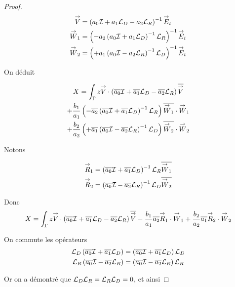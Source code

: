 \begin{proof}
    \newcommand{\vV}{\vect{V}}
    \newcommand{\vW}{\vect{W}}

    \begin{align*}
      \vV & = \left(a_0\oI  + a_1 \LD - a_2\LR \right)^{-1} \vE_t
      \\
      \vW_1 & = \left( - a_2 \left( a_0\oI + a_1\LD\right)^{-1}\LR\right)^{-1} \vE_t
      \\
      \vW_2 & = \left( + a_1 \left( a_0\oI - a_2\LR\right)^{-1}\LD\right)^{-1} \vE_t
    \end{align*}

    On déduit

    \begin{multline*}
      X = \int_\Gamma z \vV \cdot \left(\conj{a_0}\oI  + \conj{a_1} \LD - \conj{a_2}\LR\right)\conj{\vV}
      \\
      + \frac{b_1}{a_1} \left( - \conj{a_2} \left( \conj{a_0}\oI + \conj{a_1}\LD\right)^{-1}\LR\right)\conj{\vW_1}\cdot\vW_1
      \\
      + \frac{b_2}{a_2} \left( + \conj{a_1} \left( \conj{a_0}\oI - \conj{a_2}\LR\right)^{-1}\LD\right)\conj{\vW_2}\cdot\vW_2
    \end{multline*}

    Notons

    \newcommand{\vR}{\vect{R}}

    \begin{align*}
      \vR_1 & = \left(\conj{a_0}\oI  + \conj{a_1} \LD \right)^{-1}\LR \conj{\vW_1}
      \\
      \vR_2 & = \left(\conj{a_0}\oI  - \conj{a_2} \LR \right)^{-1}\LD \conj{\vW_2}
    \end{align*}

    Donc 
    \begin{equation*}
      X = \int_\Gamma z \vV \cdot \left(\conj{a_0}\oI  + \conj{a_1} \LD - \conj{a_2}\LR\right)\conj{\vV} - \frac{b_1}{a_1}\conj{a_2}\vR_1\cdot\vW_1 + \frac{b_2}{a_2}\conj{a_1}\vR_2\cdot\vW_2
    \end{equation*}

    On commute les opérateurs
    \begin{align*}
      {\mathcal{L}_D}\left({\overline{a_0}}{\mathcal{I}}  + {\overline{a_1}} {\mathcal{L}_D} \right)&=\left({\overline{a_0}}{\mathcal{I}}  + {\overline{a_1}} {\mathcal{L}_D} \right){\mathcal{L}_D}
      \\
      {\mathcal{L}_R}\left({\overline{a_0}}{\mathcal{I}}  - {\overline{a_2}} {\mathcal{L}_R} \right)&=\left({\overline{a_0}}{\mathcal{I}}  - {\overline{a_2}} {\mathcal{L}_R} \right){\mathcal{L}_R}
    \end{align*}

    Or on a démontré que \({\mathcal{L}_D}{\mathcal{L}_R}={\mathcal{L}_R}{\mathcal{L}_D}=0\), et ainsi


\end{proof}
